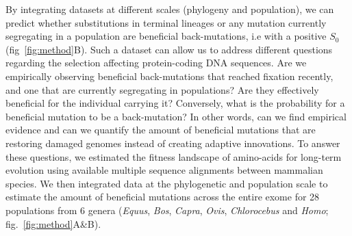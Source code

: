 \documentclass{article}
\newcommand{\Sphy}{S_{0}}
\begin{document}
    By integrating datasets at different scales (phylogeny and population), we can predict whether substitutions in terminal lineages or any mutation currently segregating in a population are beneficial back-mutations, i.e with a positive $\Sphy$ (fig~\ref{fig:method}B).
    Such a dataset can allow us to address different questions regarding the selection affecting protein-coding DNA sequences.
    Are we empirically observing beneficial back-mutations that reached fixation recently, and one that are currently segregating in populations?
    Are they effectively beneficial for the individual carrying it?
    Conversely, what is the probability for a beneficial mutation to be a back-mutation?
    In other words, can we find empirical evidence and can we quantify the amount of beneficial mutations that are restoring damaged genomes instead of creating adaptive innovations.
    To answer these questions, we estimated the fitness landscape of amino-acids for long-term evolution using available multiple sequence alignments between mammalian species\cite{ranwez_orthomam_2007, howe_ensembl_2021}.
    We then integrated data at the phylogenetic and population scale to estimate the amount of beneficial mutations across the entire exome for 28 populations from 6 genera (\textit{Equus},  \textit{Bos}, \textit{Capra}, \textit{Ovis}, \textit{Chlorocebus} and \textit{Homo}; fig.~\ref{fig:method}A\&B).
\end{document}
